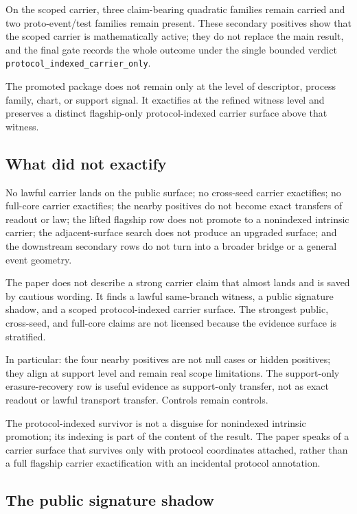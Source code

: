 \documentclass[11pt]{article}
\theoremstyle{definition}
\begin{document}
On the scoped carrier, three claim-bearing quadratic families remain carried and two
proto-event/test families remain present. These secondary positives show that the
scoped carrier is mathematically active; they do not replace the main result, and the
final gate records the whole outcome under the single bounded verdict
\texttt{protocol\_indexed\_carrier\_only}.

The promoted package does not remain only at the level of descriptor, process family,
chart, or support signal. It exactifies at the refined witness level and preserves a
distinct flagship-only protocol-indexed carrier surface above that witness.

\subsection{What did not exactify}

No lawful carrier lands on the public surface; no cross-seed carrier exactifies; no
full-core carrier exactifies; the nearby positives do not become exact transfers of
readout or law; the lifted flagship row does not promote to a nonindexed intrinsic
carrier; the adjacent-surface search does not produce an upgraded surface; and the
downstream secondary rows do not turn into a broader bridge or a general event
geometry.

The paper does not describe a strong carrier claim that almost lands and is saved by
cautious wording. It finds a lawful same-branch witness, a public signature shadow,
and a scoped protocol-indexed carrier surface. The strongest public, cross-seed, and
full-core claims are not licensed because the evidence surface is stratified.

In particular: the four nearby positives are not null cases or hidden positives; they
align at support level and remain real scope limitations. The support-only
erasure-recovery row is useful evidence as support-only transfer, not as exact
readout or lawful transport transfer. Controls remain controls.

The protocol-indexed survivor is not a disguise for nonindexed intrinsic promotion;
its indexing is part of the content of the result. The paper speaks of a carrier
surface that survives only with protocol coordinates attached, rather than a full
flagship carrier exactification with an incidental protocol annotation.

\subsection{The public signature shadow}
\end{document}

